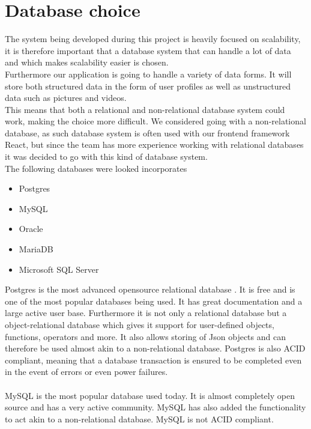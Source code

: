 \section{Database choice}
The system being developed during this project is heavily focused on scalability, it is therefore important that a database system that can handle a lot of data and which makes scalability easier is chosen.
\\
Furthermore our application is going to handle a variety of data forms. It will store both structured data in the form of user profiles as well as unstructured data such as pictures and videos.
\\
This means that both a relational and non-relational database system could work, making the choice more difficult.
We considered going with a non-relational database, as such database system is often used with our frontend framework React, but since the team has more experience working with relational databases it was decided to go with this kind of database system.
\\
The following databases were looked incorporates
\begin{itemize}
    \item Postgres
    \item MySQL
    \item Oracle
    \item MariaDB
    \item Microsoft SQL Server
\end{itemize}
Postgres is the most advanced opensource relational database \cite{Postgres}.
It is free and is one of the most popular databases being used\cite{databasePopularity}.
It has great documentation and a large active user base.
Furthermore it is not only a relational database but a object-relational database which gives it support for user-defined objects, functions, operators and more.
It also allows storing of Json objects and can therefore be used almost akin to a non-relational database.
Postgres is also ACID compliant, meaning that a database transaction is ensured to be completed even in the event of errors or even power failures.
\\
\\
MySQL is the most popular database used today\cite{databasePopularity}.
It is almost completely open source and has a very active community\cite{MySQL}.
MySQL has also added the functionality to act akin to a non-relational database.
MySQL is not ACID compliant.
\\
\\

